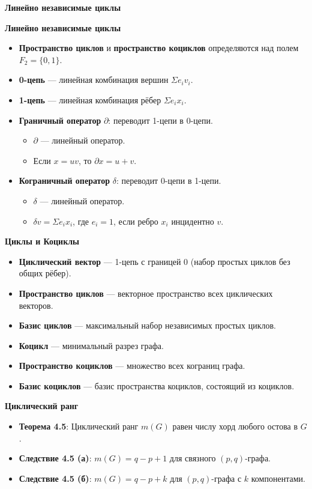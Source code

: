\textbf{Линейно независимые циклы}

\noindent\textbf{Линейно независимые циклы}
\begin{itemize}
    \item \textbf{Пространство циклов} и \textbf{пространство коциклов} определяются над полем $F_2 = \{0, 1\}$.
    \item \textbf{0-цепь} — линейная комбинация вершин $\Sigma e_i v_i$.
    \item \textbf{1-цепь} — линейная комбинация рёбер $\Sigma e_i x_i$.
    \item \textbf{Граничный оператор} $\partial$: переводит 1-цепи в 0-цепи.
    \begin{itemize}
        \item $\partial$ — линейный оператор.
        \item Если $x = uv$, то $\partial x = u + v$.
    \end{itemize}
    \item \textbf{Кограничный оператор} $\delta$: переводит 0-цепи в 1-цепи.
    \begin{itemize}
        \item $\delta$ — линейный оператор.
        \item $\delta v = \Sigma e_i x_i$, где $e_i = 1$, если ребро $x_i$ инцидентно $v$.
    \end{itemize}
\end{itemize}

\noindent\textbf{Циклы и Коциклы}
\begin{itemize}
    \item \textbf{Циклический вектор} — 1-цепь с границей 0 (набор простых циклов без общих рёбер).
    \item \textbf{Пространство циклов} — векторное пространство всех циклических векторов.
    \item \textbf{Базис циклов} — максимальный набор независимых простых циклов.
    \item \textbf{Коцикл} — минимальный разрез графа.
    \item \textbf{Пространство коциклов} — множество всех кограниц графа.
    \item \textbf{Базис коциклов} — базис пространства коциклов, состоящий из коциклов.
\end{itemize}

\noindent\textbf{Циклический ранг}
\begin{itemize}
    \item \textbf{Теорема 4.5}: Циклический ранг $m(G)$ равен числу хорд любого остова в $G$.
    \item \textbf{Следствие 4.5 (а)}: $m(G) = q - p + 1$ для связного $(p, q)$-графа.
    \item \textbf{Следствие 4.5 (б)}: $m(G) = q - p + k$ для $(p, q)$-графа с $k$ компонентами.
\end{itemize}

